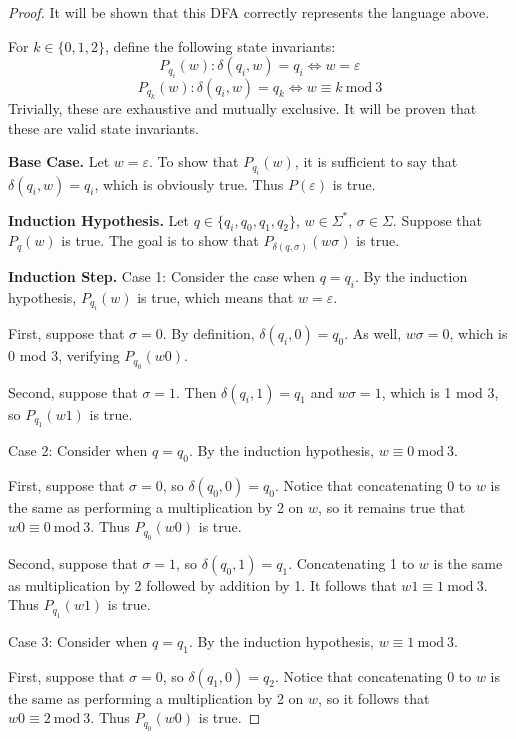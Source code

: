 \documentclass[11pt]{article}
\begin{document}
\begin{enumerate}[label=\textbf{Q\arabic*.}]
\begin{enumerate}[label=\textit{\alph*)}]
\begin{proof}
		It will be shown that this DFA correctly represents the language above.

		For \(k \in \{0, 1, 2\}\), define the following state invariants:
		\[
			P_{q_i}(w) : \delta (q_i, w) = q_i \iff w = \varepsilon
		\]
		\[
			P_{q_k}(w) : \delta (q_i, w) = q_k \iff w \equiv k \ \mathrm{mod}\ 3
		\]
		Trivially, these are exhaustive and mutually exclusive. It will be proven that these are valid state invariants.

		\textbf{Base Case.} Let \(w = \varepsilon\). To show that \(P_{q_i}(w)\), it is sufficient to say that \(\delta (q_i, w) = q_i\), which is obviously true. Thus \(P(\varepsilon)\) is true.

		\medskip

		\textbf{Induction Hypothesis.} Let \(q \in \{q_i , q_0, q_1, q_2\}\), \(w \in \Sigma ^*\), \(\sigma \in \Sigma\). Suppose that \(P_q(w)\) is true. The goal is to show that \(P_{\delta (q,\sigma)}(w \sigma)\) is true.

		\medskip

		\textbf{Induction Step.} Case 1: Consider the case when \(q = q_i\). By the induction hypothesis, \(P_{q_i}(w)\) is true, which means that \(w = \varepsilon\).

		First, suppose that \(\sigma = 0\). By definition, \(\delta (q_i,0) = q_0\). As well, \(w \sigma = 0\), which is 0 mod 3, verifying \(P_{q_0}(w0)\).

		Second, suppose that \(\sigma = 1\). Then \(\delta (q_i, 1) = q_1\) and \(w \sigma = 1\), which is 1 mod 3, so \(P_{q_1}(w1)\) is true.

		Case 2: Consider when \(q = q_0\). By the induction hypothesis, \(w \equiv 0 \ \mathrm{mod} \ 3\).

		First, suppose that \(\sigma = 0\), so \(\delta (q_0, 0) = q_0\). Notice that concatenating 0 to \(w\) is the same as performing a multiplication by 2 on \(w\), so it remains true that \(w0 \equiv 0\ \mathrm{mod} \ 3\). Thus \(P_{q_0}(w0)\) is true.

		Second, suppose that \(\sigma = 1\), so \(\delta (q_0, 1) = q_1\). Concatenating 1 to \(w\) is the same as multiplication by 2 followed by addition by 1. It follows that \(w1 \equiv 1\ \mathrm{mod} \ 3\). Thus \(P_{q_1}(w1)\) is true.

		Case 3: Consider when \(q = q_1\). By the induction hypothesis, \(w \equiv 1\ \mathrm{mod} \ 3\).

		First, suppose that \(\sigma = 0\), so \(\delta (q_1, 0) = q_2\). Notice that concatenating 0 to \(w\) is the same as performing a multiplication by 2 on \(w\), so it follows that \(w0 \equiv 2\ \mathrm{mod} \ 3\). Thus \(P_{q_0}(w0)\) is true.


\end{proof}
\end{enumerate}
\end{enumerate}
\end{document}
